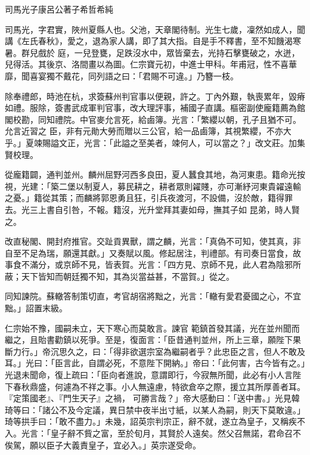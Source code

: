 
\begin{pinyinscope}

 司馬光子康呂公著子希哲希純



 司馬光，字君實，陜州夏縣人也。父池，天章閣待制。光生七歲，凜然如成人，聞講《左氏春秋》，愛之，退為家人講，即了其大指。自是手不釋書，至不知饑渴寒暑。群兒戲於
 庭，一兒登甕，足跌沒水中，眾皆棄去，光持石擊甕破之，水迸，兒得活。其後京、洛間畫以為圖。仁宗寶元初，中進士甲科。年甫冠，性不喜華靡，聞喜宴獨不戴花，同列語之曰：「君賜不可違。」乃簪一枝。



 除奉禮郎，時池在杭，求簽蘇州判官事以便親，許之。丁內外艱，執喪累年，毀瘠如禮。服除，簽書武成軍判官事，改大理評事，補國子直講。樞密副使龐籍薦為館閣校勘，同知禮院。中官麥允言死，給鹵簿。光言：「繁纓以朝，孔子且猶不可。允言近習之
 臣，非有元勛大勞而贈以三公官，給一品鹵簿，其視繁纓，不亦大乎。」夏竦賜謚文正，光言：「此謚之至美者，竦何人，可以當之？」改文莊。加集賢校理。



 從龐籍闢，通判並州。麟州屈野河西多良田，夏人蠶食其地，為河東患。籍命光按視，光建：「築二堡以制夏人，募民耕之，耕者眾則糴賤，亦可漸紓河東貴糴遠輸之憂。」籍從其策；而麟將郭恩勇且狂，引兵夜渡河，不設備，沒於敵，籍得罪去。光三上書自引咎，不報。籍沒，光升堂拜其妻如母，撫其子如
 昆弟，時人賢之。



 改直秘閣、開封府推官。交趾貢異獸，謂之麟，光言：「真偽不可知，使其真，非自至不足為瑞，願還其獻。」又奏賦以風。修起居注，判禮部。有司奏日當食，故事食不滿分，或京師不見，皆表賀。光言：「四方見、京師不見，此人君為陰邪所蔽；天下皆知而朝廷獨不知，其為災當益甚，不當賀。」從之。



 同知諫院。蘇轍答制策切直，考官胡宿將黜之，光言：「轍有愛君憂國之心，不宜黜。」詔置末級。



 仁宗始不豫，國嗣未立，天下寒心而莫敢言。諫官
 範鎮首發其議，光在並州聞而繼之，且貽書勸鎮以死爭。至是，復面言：「臣昔通判並州，所上三章，願陛下果斷力行。」帝沉思久之，曰：「得非欲選宗室為繼嗣者乎？此忠臣之言，但人不敢及耳。」光曰：「臣言此，自謂必死，不意陛下開納。」帝曰：「此何害，古今皆有之。」光退未聞命，復上疏曰：「臣向者進說，意謂即行，今寂無所聞，此必有小人言陛下春秋鼎盛，何遽為不祥之事。小人無遠慮，特欲倉卒之際，援立其所厚善者耳。『定策國老』、『門生天子』之禍，
 可勝言哉？」帝大感動曰：「送中書。」光見韓琦等曰：「諸公不及今定議，異日禁中夜半出寸紙，以某人為嗣，則天下莫敢違。」琦等拱手曰：「敢不盡力。」未幾，詔英宗判宗正，辭不就，遂立為皇子，又稱疾不入。光言：「皇子辭不貲之富，至於旬月，其賢於人遠矣。然父召無諾，君命召不俟駕，願以臣子大義責皇子，宜必入。」英宗遂受命。




\end{pinyinscope}
